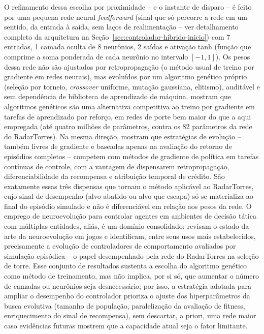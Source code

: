 \documentclass[12pt,a4paper]{article}
\begin{document}
O refinamento dessa escolha por proximidade -- e o instante de disparo -- é feito por uma pequena
rede neural \textit{feedforward} (sinal que só percorre a rede em um sentido, da entrada à saída,
sem laços de realimentação -- ver detalhamento completo da arquitetura na
Seção~\ref{sec:controlador-hibrido-inicio}) com 7 entradas, 1
camada oculta de 8 neurônios, 2 saídas e ativação tanh (função que comprime a soma ponderada de
cada neurônio no intervalo $[-1,1]$). Os pesos dessa rede não são ajustados por retropropagação
(o método usual de treino por gradiente em redes neurais), mas evoluídos por um algoritmo genético
próprio (seleção por torneio, \textit{crossover} uniforme, mutação gaussiana, elitismo), auditável e
sem dependência de biblioteca de aprendizado de máquina. 
mostram que algoritmos genéticos são uma alternativa competitiva ao treino por gradiente em tarefas
de aprendizado por reforço, em redes de porte bem maior do que a aqui empregada (até quatro milhões
de parâmetros, contra os 82 parâmetros da rede do RadarTorres). Na mesma direção,
 mostram que estratégias de evolução -- também livres de gradiente e
baseadas apenas na avaliação do retorno de episódios completos -- competem com métodos de gradiente
de política em tarefas contínuas de controle, com a vantagem de dispensarem retropropagação,
diferenciabilidade da recompensa e atribuição temporal de crédito. São exatamente essas três
dispensas que tornam o método aplicável ao RadarTorres, cujo sinal de desempenho (alvo abatido ou
alvo que escapa) só se materializa ao final do episódio simulado e não é diferenciável em relação
aos pesos da rede. O emprego de neuroevolução para controlar agentes em ambientes de decisão tática
com múltiplas entidades, aliás, é um domínio consolidado: 
revisam o estado da arte da neuroevolução em jogos e identificam, entre seus usos mais
estabelecidos, precisamente a evolução de controladores de comportamento avaliados por simulação
episódica -- o papel desempenhado pela rede do RadarTorres na seleção de torre. Esse conjunto de
resultados sustenta a escolha
do algoritmo genético como método de treinamento, mas não implica, por si só, que aumentar o número
de camadas ou neurônios seja desnecessário; por isso, a estratégia adotada para ampliar o
desempenho do controlador prioriza o ajuste dos hiperparâmetros da busca evolutiva (tamanho de
população, paralelização da avaliação de fitness, enriquecimento do sinal de recompensa), sem
descartar, a priori, uma rede maior caso evidências futuras mostrem que a capacidade atual seja o
fator limitante.
\end{document}
